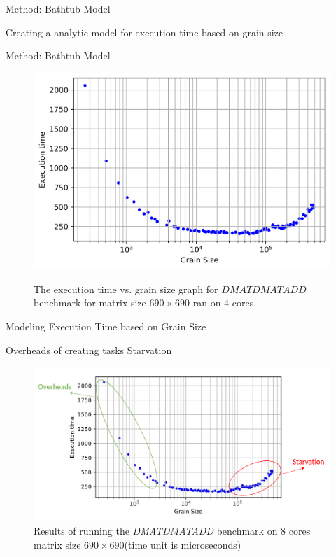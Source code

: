 \documentclass[10pt]{beamer}
\begin{document}
\begin{frame}{Method: Bathtub Model}
	\begin{outline}
		Creating a analytic model for execution time based on grain size
	\end{outline}
\end{frame}


\begin{frame}{Method: Bathtub Model}
	\begin{outline}
\begin{figure}[H]
	\centering
	{\includegraphics[scale=.3]{images/bathtub/all_690_4.png}\label{fig20:a}}
	\caption{The execution time vs. grain size graph for $DMATDMATADD$ benchmark for matrix size $690\times690$ ran on $4$ cores.}	
	\label{fig21}
\end{figure}
	\end{outline}
\end{frame}	


\begin{frame}{Modeling Execution Time based on Grain Size}
	\begin{outline}		
		\1Overheads of creating tasks
		\1Starvation
		\begin{figure}
			
			\includegraphics[width=0.9\linewidth]{images/bathtub/all_690_4_star_over.png}	
			\caption{Results of running the \textit{DMATDMATADD} benchmark on $8$ cores matrix size $690\times690$(time unit is microseconds)}	
		\end{figure}
	\end{outline}
\end{frame}
\end{document}
